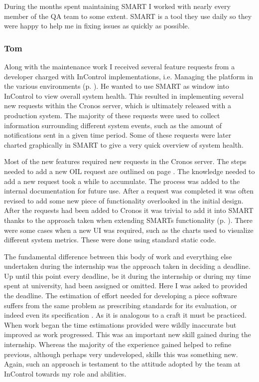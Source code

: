\documentclass[a4paper, 11pt, titlepage]{article}
\begin{document}
During the months spent maintaining SMART I worked with nearly every member of the QA team to some extent. SMART is a tool they use daily so they were happy to help me in fixing issues as quickly as possible. 
 
\subsubsection{Tom} 
Along with the maintenance work I received several feature requests from a developer charged with InControl implementations, i.e. Managing the platform in the various environments (p. \pageref{release_environments}). He wanted to use SMART as window into InControl to view overall system health. This resulted in implementing several new requests within the Cronos server, which is ultimately released with a production system. The majority of these requests were used to collect information surrounding different system events, such as the amount of notifications sent in a given time period. Some of these requests were later charted graphically in SMART to give a very quick overview of system health. 

Most of the new features required new requests in the Cronos server. The steps needed to add a new OIL request are outlined on page \pageref{OIL}. The knowledge needed to add a new request took a while to accumulate. The process was added to the internal documentation for future use. After a request was completed it was often revised to add some new piece of functionality overlooked in the initial design. After the requests had been added to Cronos it was trivial to add it into SMART thanks to the approach taken when extending SMARTs functionality (p. \pageref{dynamic_smart}). There were some cases when a new UI was required, such as the charts used to visualize different system metrics. These were done using standard static code.

The fundamental difference between this body of work and everything else undertaken during the internship was the approach taken in deciding a deadline. Up until this point every deadline, be it during the internship or during my time spent at university, had been assigned or omitted. Here I was asked to provided the deadline. The estimation of effort needed for developing a piece software suffers from the same problem as prescribing standards for its evaluation, or indeed even its specification \cite{NoBullet} \cite{cMellonTest}. As it is analogous to a craft it must be practiced. When work began the time estimations provided were wildly inaccurate but improved as work progressed. This was an important new skill gained during the internship. Whereas the majority of the experience gained helped to refine previous, although perhaps very undeveloped, skills this was something new. Again, such an approach is testament to the attitude adopted by the team at InControl towards my role and abilities.
\end{document}
